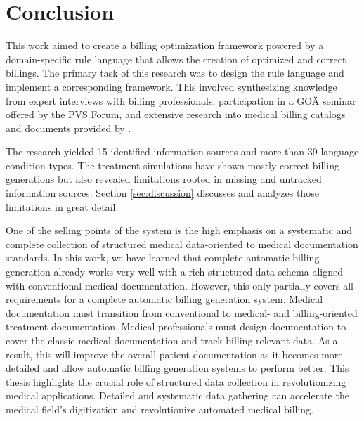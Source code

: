 \section{Conclusion}\label{sec:conclusion}
This work aimed to create a billing optimization framework powered by a domain-specific rule language that allows the creation of optimized and correct billings.
The primary task of this research was to design the rule language and implement a corresponding framework.
This involved synthesizing knowledge from expert interviews with billing professionals,
participation in a GOÄ seminar offered by the PVS Forum, and extensive research into medical billing catalogs and documents provided by \AV.

The research yielded 15 identified information sources and more than 39 language condition types.
The treatment simulations have shown mostly correct billing generations but also revealed limitations rooted in missing and untracked information sources.
Section \ref{sec:discussion} discusses and analyzes those limitations in great detail.

One of the selling points of the \AV system is the high emphasis on a systematic and complete collection of structured medical data-oriented to medical documentation standards.
In this work, we have learned that complete automatic billing generation already works very well with a rich structured data schema aligned with conventional medical documentation.
However, this only partially covers all requirements for a complete automatic billing generation system.
Medical documentation must transition from conventional to medical- and billing-oriented treatment documentation.
Medical professionals must design documentation to cover the classic medical documentation and track billing-relevant data.
As a result, this will improve the overall patient documentation as it becomes more detailed and allow automatic billing generation systems to perform better.
This thesis highlights the crucial role of structured data collection in revolutionizing medical applications.
Detailed and systematic data gathering can accelerate the medical field's digitization and revolutionize automated medical billing.
